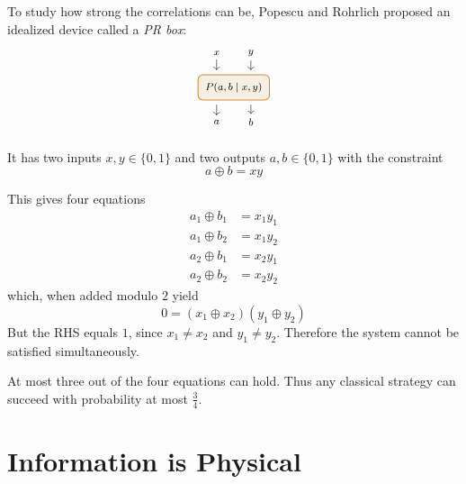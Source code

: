 To study how strong the correlations can be, Popescu and Rohrlich proposed an idealized device called a \emph{PR box}:
\[\begin{tikzpicture}[scale=1.2, font=\footnotesize]

\definecolor{prbox}{RGB}{214,140,60}

\node[
draw=prbox,
fill=prbox!15,
rounded corners=4pt,
thick,
minimum width=2cm,
minimum height=0.7cm,
outer sep=0.5em
] (box) at (0,0)
{$P(a,b\mid x,y)$};

\node (x) at (-0.4,0.8) {$x$};
\node (y) at (0.4,0.8) {$y$};

\node (a) at (-0.4,-0.8) {$a$};
\node (b) at (0.4,-0.8) {$b$};

\draw[->] (x) -- (-0.4,0.4);
\draw[->] (y) -- (0.4,0.4);

\draw[->] (-0.4,-0.4) -- (a);
\draw[->] (0.4,-0.4) -- (b);

\end{tikzpicture}\]



It has two inputs 
\(
x,y \in \{0,1\}
\)
and two outputs
\(
a,b \in \{0,1\}
\)
with the constraint
\[
a \oplus b = x y
\]

This gives four equations
\[
\begin{aligned}
a_1 \oplus b_1 &= x_1 y_1 \\
a_1 \oplus b_2 &= x_1 y_2 \\
a_2 \oplus b_1 &= x_2 y_1 \\
a_2 \oplus b_2 &= x_2 y_2
\end{aligned}
\]
which, when added modulo \(2\) yield
\[
0 = (x_1 \oplus x_2)(y_1 \oplus y_2)
\]
But the RHS equals \(1\), since \(x_1 \neq x_2\) and \(y_1 \neq y_2\).
Therefore the system cannot be satisfied simultaneously.

At most three out of the four equations can hold.
Thus any classical strategy can succeed with probability at most
\(
\frac{3}{4}
\).


\clearpage


\section{Information is Physical}



